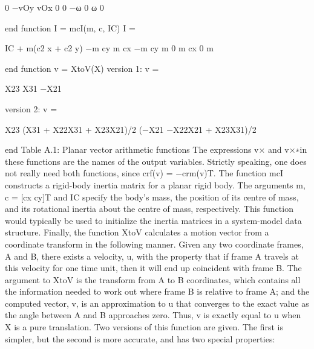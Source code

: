 0 −vOy vOx 0 0 −ω 0 ω 0

end function I = mcI(m, c, IC) I =

IC + m(c2 x + c2 y) −m cy m cx −m cy m 0 m cx 0 m

end function v = XtoV(X) version 1: v =

X23 X31 −X21

version 2: v =

X23 (X31 + X22X31 + X23X21)/2 (−X21 −X22X21 + X23X31)/2

end Table A.1: Planar vector arithmetic functions The expressions v× and v×∗in these functions are the names of the output variables. Strictly speaking, one does not really need both functions, since crf(v) = −crm(v)T. The function mcI constructs a rigid-body inertia matrix for a planar rigid body. The arguments m, c = [cx cy]T and IC specify the body’s mass, the position of its centre of mass, and its rotational inertia about the centre of mass, respectively. This function would typically be used to initialize the inertia matrices in a system-model data structure. Finally, the function XtoV calculates a motion vector from a coordinate transform in the following manner. Given any two coordinate frames, A and B, there exists a velocity, u, with the property that if frame A travels at this velocity for one time unit, then it will end up coincident with frame B. The argument to XtoV is the transform from A to B coordinates, which contains all the information needed to work out where frame B is relative to frame A; and the computed vector, v, is an approximation to u that converges to the exact value as the angle between A and B approaches zero. Thus, v is exactly equal to u when X is a pure translation. Two versions of this function are given. The first is simpler, but the second is more accurate, and has two special properties:

